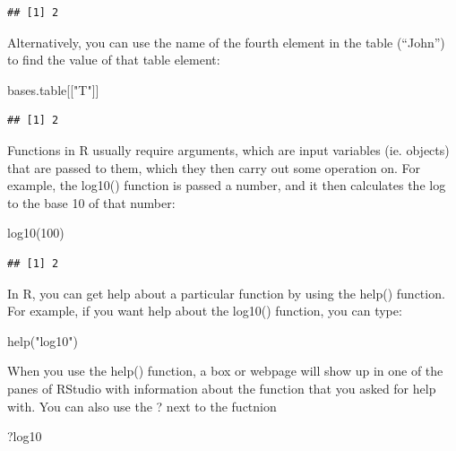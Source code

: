 \documentclass[
]{book}
\newenvironment{Shaded}{\begin{snugshade}}{\end{snugshade}}
\newcommand{\DecValTok}[1]{\textcolor[rgb]{0.00,0.00,0.81}{#1}}
\newcommand{\FunctionTok}[1]{\textcolor[rgb]{0.00,0.00,0.00}{#1}}
\newcommand{\NormalTok}[1]{#1}
\newcommand{\StringTok}[1]{\textcolor[rgb]{0.31,0.60,0.02}{#1}}
\begin{document}
\begin{verbatim}
## [1] 2
\end{verbatim}

Alternatively, you can use the name of the fourth element in the table (``John'') to find the value of that table element:

\begin{Shaded}
\begin{Highlighting}[]
\NormalTok{bases.table[[}\StringTok{"T"}\NormalTok{]]}
\end{Highlighting}
\end{Shaded}

\begin{verbatim}
## [1] 2
\end{verbatim}

Functions in R usually require arguments, which are input variables (ie. objects) that are passed to them, which they then carry out some operation on. For example, the log10() function is passed a number, and it then calculates the log to the base 10 of that number:

\begin{Shaded}
\begin{Highlighting}[]
\FunctionTok{log10}\NormalTok{(}\DecValTok{100}\NormalTok{)}
\end{Highlighting}
\end{Shaded}

\begin{verbatim}
## [1] 2
\end{verbatim}

In R, you can get help about a particular function by using the help() function. For example, if you want help about the log10() function, you can type:

\begin{Shaded}
\begin{Highlighting}[]
\FunctionTok{help}\NormalTok{(}\StringTok{"log10"}\NormalTok{)}
\end{Highlighting}
\end{Shaded}

When you use the help() function, a box or webpage will show up in one of the panes of RStudio with information about the function that you asked for help with. You can also use the ? next to the fuctnion

\begin{Shaded}
\begin{Highlighting}[]
\NormalTok{?log10}
\end{Highlighting}
\end{Shaded}
\end{document}
